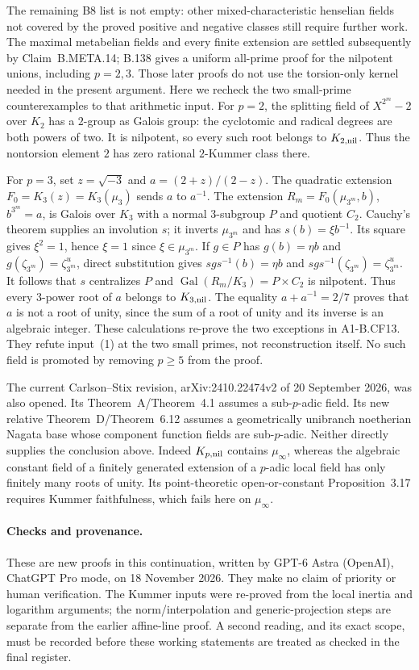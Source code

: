 The remaining B8 list is not empty: other mixed-characteristic
henselian fields not covered by the proved positive and negative
classes still require further work.
The maximal metabelian fields and every finite extension are
settled subsequently by Claim~B.META.14; B.138 gives a uniform
all-prime proof for the nilpotent unions, including $p=2,3$.
Those later proofs do not use the torsion-only kernel needed
in the present argument.  Here we recheck the two small-prime
counterexamples to that arithmetic input.
For $p=2$, the splitting field of $X^{2^m}-2$ over $K_2$ has
a $2$-group as Galois group: the cyclotomic and radical degrees
are both powers of two.  It is nilpotent, so every such root
belongs to $K_{2,\rm nil}$.  Thus the nontorsion element $2$
has zero rational $2$-Kummer class there.

For $p=3$, set $z=\sqrt{-3}$ and $a=(2+z)/(2-z)$.
The quadratic extension $F_0=K_3(z)=K_3(\mu_3)$ sends $a$
to $a^{-1}$.  The extension
$R_m=F_0(\mu_{3^m},b)$, $b^{3^m}=a$, is Galois over $K_3$
with a normal $3$-subgroup $P$ and quotient $C_2$.
Cauchy's theorem supplies an involution $s$; it inverts
$\mu_{3^m}$ and has $s(b)=\xi b^{-1}$.  Its square gives
$\xi^2=1$, hence $\xi=1$ since $\xi\in\mu_{3^m}$.
If $g\in P$ has $g(b)=\eta b$ and
$g(\zeta_{3^m})=\zeta_{3^m}^{u}$, direct substitution gives
$sgs^{-1}(b)=\eta b$ and
$sgs^{-1}(\zeta_{3^m})=\zeta_{3^m}^{u}$.
It follows that $s$ centralizes $P$ and
$\operatorname{Gal}(R_m/K_3)=P\times C_2$ is nilpotent.
Thus every $3$-power root of $a$ belongs to $K_{3,\rm nil}$.
The equality $a+a^{-1}=2/7$ proves that $a$ is not a root
of unity, since the sum of a root of unity and its inverse is
an algebraic integer.  These calculations re-prove the two
exceptions in A1-B.CF13.  They refute input~(1) at the two small
primes, not reconstruction itself.  No such field is promoted by
removing $p\geq5$ from the proof.

The current Carlson--Stix revision, arXiv:2410.22474v2 of
20 September 2026, was also opened.  Its Theorem~A/Theorem~4.1
assumes a sub-$p$-adic field.  Its new relative
Theorem~D/Theorem~6.12 assumes a geometrically unibranch
noetherian Nagata base whose component function fields are
sub-$p$-adic.  Neither directly supplies the conclusion above.
Indeed $K_{p,\rm nil}$ contains $\mu_\infty$, whereas the
algebraic constant field of a finitely generated extension of a
$p$-adic local field has only finitely many roots of unity.
Its point-theoretic open-or-constant Proposition~3.17 requires
Kummer faithfulness, which fails here on $\mu_\infty$.

\paragraph{Checks and provenance.}
These are new proofs in this continuation, written by GPT-6 Astra
(OpenAI), ChatGPT Pro mode, on 18 November 2026.  They make no
claim of priority or human verification.  The Kummer inputs were
re-proved from the local inertia and logarithm arguments; the
norm/interpolation and generic-projection steps are separate from
the earlier affine-line proof.  A second reading, and its exact
scope, must be recorded before these working statements are
treated as checked in the final register.
